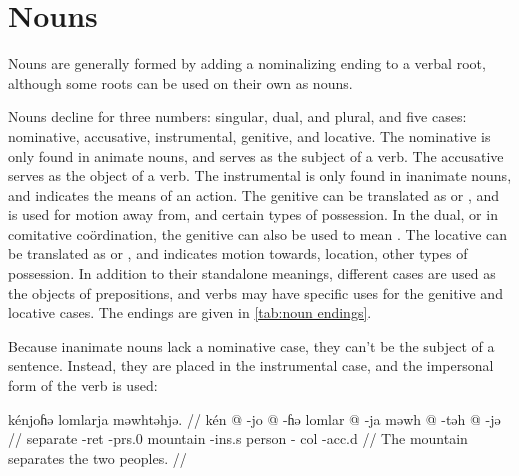 \section{Nouns}

Nouns are generally formed by adding a nominalizing ending to a verbal root,
although some roots can be used on their own as nouns.

Nouns decline for three numbers: singular, dual, and plural, and five cases:
nominative, accusative, instrumental, genitive, and locative.
The nominative is only found in animate nouns, and serves as the subject of a
verb.
The accusative serves as the object of a verb.
The instrumental is only found in inanimate nouns, and indicates the means of
an action.
The genitive can be translated as  or , and is used for motion
away from, and certain types of possession.
In the dual, or in comitative coördination, the genitive can also be used to
mean .
The locative can be translated as  or , and indicates motion
towards, location, other types of possession.
In addition to their standalone meanings, different cases are used as the objects of
prepositions, and verbs may have specific uses for the genitive and locative
cases. The endings are given in \cref{tab:noun endings}.

Because inanimate nouns lack a nominative case, they can't be the subject of a
sentence. Instead, they are placed in the instrumental case, and the impersonal
form of the verb is used:

\ex
\begingl
    \glpreamble kénjoɦə lomlarja məwhtəhjə. //
    \gla kén @ -jo @ -ɦə lomlar @ -ja məwh @ -təh @ -jə //
    \glb separate -{\sc ret} -{\sc prs}.0 mountain -{\sc ins}.s person -{\sc
        col} -{\sc acc}.d //
    \glft The mountain separates the two peoples. //
\endgl
\xe

